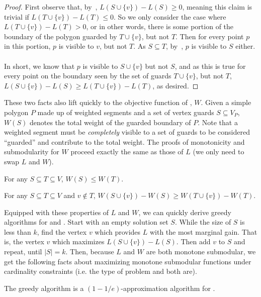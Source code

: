\begin{proof}
    First observe that, by~, $L(S\cup\{v\})-L(S)\geq 0$, meaning this claim is trivial if $L(T\cup\{v\})-L(T)\leq 0$. So we only consider the case where $L(T\cup\{v\})-L(T)>0$, or in other words, there is some portion of the boundary of the polygon guarded by $T\cup\{v\}$, but not $T$. Then for every point $p$ in this portion, $p$ is visible to $v$, but not $T$. As $S\subseteq T$, by~, $p$ is visible to $S$ either. \\\\
    In short, we know that $p$ is visible to $S\cup\{v\}$ but not $S$, and as this is true for every point on the boundary seen by the set of guards $T\cup\{v\}$, but not $T$, $L(S\cup\{v\})-L(S)\geq L(T\cup\{v\})-L(T)$, as desired.
\end{proof}
\noindent
These two facts also lift quickly to the objective function of \MVVG{}, $W$. Given a simple polygon $P$ made up of weighted segments and a set of vertex guards $S\subseteq V_P$, $W(S)$ denotes the total weight of the guarded boundary of $P$. Note that a weighted segment must be \emph{completely} visible to a set of guards to be considered ``guarded'' and contribute to the total weight. The proofs of monotonicity and submodularity for $W$ proceed exactly the same as those of $L$ (we only need to swap $L$ and $W$).

\begin{observation}\label{obs:monotone-w}
    For any $S\subseteq T\subseteq V$, $W(S)\leq W(T)$.
\end{observation}

\begin{claim}\label{clm:submodular-w}
    For any $S\subseteq T\subseteq V$ and $v\notin T$, $W(S\cup\{v\})-W(S)\geq W(T\cup\{v\})-W(T)$.
\end{claim}
\noindent
Equipped with these properties of $L$ and $W$, we can quickly derive greedy algorithms for \MLVG{} and \MVVG{}. Start with an empty solution set $S$. While the size of $S$ is less than $k$, find the vertex $v$ which provides $L$ with the most marginal gain. That is, the vertex $v$ which maximizes $L(S\cup\{v\})-L(S)$. Then add $v$ to $S$ and repeat, until $|S|=k$. Then, because $L$ and $W$ are both monotone submodular, we get the following facts about maximizing monotone submodular functions under cardinality constraints (i.e. the type of problem \MLVG{} and \MVVG{} both are).

\begin{theorem}
    The greedy algorithm is a $(1-1/e)$-approximation algorithm for \MLVG{}. 
\end{theorem}

